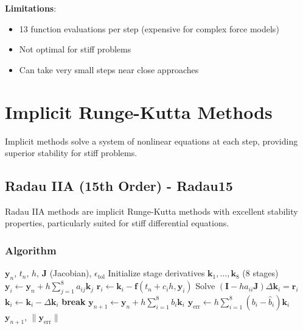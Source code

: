 \textbf{Limitations}:
\begin{itemize}
    \item 13 function evaluations per step (expensive for complex force models)
    \item Not optimal for stiff problems
    \item Can take very small steps near close approaches
\end{itemize}

\section{Implicit Runge-Kutta Methods}

Implicit methods solve a system of nonlinear equations at each step, providing superior stability for stiff problems.

\subsection{Radau IIA (15th Order) - Radau15}

Radau IIA methods are implicit Runge-Kutta methods with excellent stability properties, particularly suited for stiff differential equations.

\subsubsection{Algorithm}

\begin{algorithm}[H]
\caption{Radau15 Integration Step}
\begin{algorithmic}[1]
\REQUIRE $\mathbf{y}_n$, $t_n$, $h$, $\mathbf{J}$ (Jacobian), $\epsilon_{\text{tol}}$
\STATE Initialize stage derivatives $\mathbf{k}_1, \ldots, \mathbf{k}_8$ (8 stages)
        \STATE $\mathbf{y}_i \gets \mathbf{y}_n + h\sum_{j=1}^{8} a_{ij} \mathbf{k}_j$ 
        \STATE $\mathbf{r}_i \gets \mathbf{k}_i - \mathbf{f}(t_n + c_i h, \mathbf{y}_i)$ 
        \STATE Solve $(\mathbf{I} - h a_{ii} \mathbf{J}) \Delta\mathbf{k}_i = \mathbf{r}_i$ 
        \STATE $\mathbf{k}_i \gets \mathbf{k}_i - \Delta\mathbf{k}_i$
    \ENDFOR
        \STATE \textbf{break} 
    \ENDIF
\ENDFOR
\STATE $\mathbf{y}_{n+1} \gets \mathbf{y}_n + h\sum_{i=1}^{8} b_i \mathbf{k}_i$ 
\STATE $\mathbf{y}_{\text{err}} \gets h\sum_{i=1}^{8} (b_i - \hat{b}_i) \mathbf{k}_i$ 
\RETURN $\mathbf{y}_{n+1}$, $\|\mathbf{y}_{\text{err}}\|$
\end{algorithmic}
\end{algorithm}

